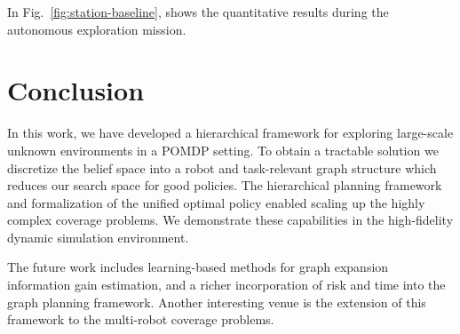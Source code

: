 \documentclass[letterpaper]{article} %
\begin{document}
In Fig.~\ref{fig:station-baseline}, shows the quantitative results during the autonomous exploration mission.



%







\section{Conclusion}\label{sec:conclusion}

In this work, we have developed a hierarchical framework for exploring large-scale unknown environments in a POMDP setting. 
To obtain a tractable solution we discretize the belief space into a robot and task-relevant graph structure which reduces our search space for good policies.
The hierarchical planning framework and formalization of the unified optimal policy enabled scaling up the highly complex coverage problems.
We demonstrate these capabilities in the high-fidelity dynamic simulation environment.  

The future work includes learning-based methods for graph expansion information gain estimation, and a richer incorporation of risk and time into the graph planning framework.
Another interesting venue is the extension of this framework to the multi-robot coverage problems.




\end{document}
